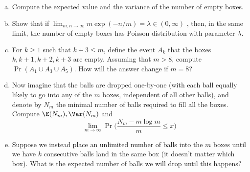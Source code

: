\begin{enumerate}[(a)]

\item Compute the expected value and the variance of the number of empty boxes.

\item Show that if \(\lim_{m, n \to \infty} m \exp(-n/m) = \lambda \in (0, \infty)\) , then, in the same limit, the number of empty boxes has Poisson distribution with parameter \(\lambda\). 
\item For \(k \geq 1\) such that \(k + 3 \leq m\), define the event \(A_k\) that the boxes \(k, k+1, k+2, k+3\) are empty. Assuming that \(m > 8\), compute \(\Pr(A_1 \cup A_3 \cup A_5)\). How will the answer change if \(m = 8\)?

\item Now imagine that the balls are dropped one-by-one (with each ball equally likely to go into any of the \(m\) boxes, independent of all other balls), and denote by \(N_m\) the minimal number of balls required to fill all the boxes. Compute \(\E(N_m), \Var(N_m)\) and \[ \lim_{m \to \infty} \Pr \bigg( \frac{N_m - m \log m}{m} \leq x \bigg) \]

\item Suppose we instead place an unlimited number of balls into the \(m\) boxes until we have \(k\) consecutive balls land in the same box (it doesn't matter which box). What is the expected number of balls we will drop until this happens?

\end{enumerate}

